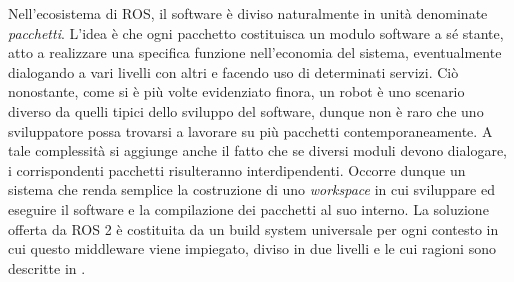 \indent Nell'ecosistema di ROS, il software è diviso naturalmente in unità denominate \emph{pacchetti}. L'idea è che ogni pacchetto costituisca un modulo software a sé stante, atto a realizzare una specifica funzione nell'economia del sistema, eventualmente dialogando a vari livelli con altri e facendo uso di determinati servizi. Ciò nonostante, come si è più volte evidenziato finora, un robot è uno scenario diverso da quelli tipici dello sviluppo del software, dunque non è raro che uno sviluppatore possa trovarsi a lavorare su più pacchetti contemporaneamente. A tale complessità si aggiunge anche il fatto che se diversi moduli devono dialogare, i corrispondenti pacchetti risulteranno interdipendenti. Occorre dunque un sistema che renda semplice la costruzione di uno \emph{workspace} in cui sviluppare ed eseguire il software e la compilazione dei pacchetti al suo interno. La soluzione offerta da ROS 2 è costituita da un build system universale per ogni contesto in cui questo middleware viene impiegato, diviso in due livelli e le cui ragioni sono descritte in \cite{ros2_build}.\\
